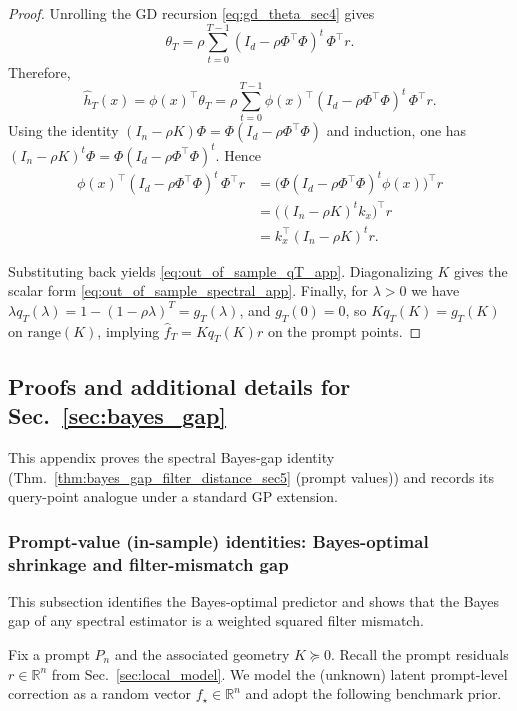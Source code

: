 \documentclass{article}
\theoremstyle{plain}
\theoremstyle{definition}
\theoremstyle{remark}
\begin{document}
\begin{proof}
Unrolling the GD recursion \eqref{eq:gd_theta_sec4} gives
\[
\theta_T
=
\rho\sum_{t=0}^{T-1}(I_d-\rho\Phi^\top\Phi)^t\,\Phi^\top r.
\]
Therefore,
\[
\hat h_T(x)
=
\phi(x)^\top\theta_T
=
\rho\sum_{t=0}^{T-1}\phi(x)^\top(I_d-\rho\Phi^\top\Phi)^t\,\Phi^\top r.
\]
Using the identity $(I_n-\rho K)\Phi=\Phi(I_d-\rho\Phi^\top\Phi)$ and induction, one has
$(I_n-\rho K)^t\Phi=\Phi(I_d-\rho\Phi^\top\Phi)^t$. Hence
\begin{align*}
    \phi(x)^\top(I_d-\rho\Phi^\top\Phi)^t\,\Phi^\top r 
    &= \bigl(\Phi(I_d-\rho\Phi^\top\Phi)^t\phi(x)\bigr)^\top r \\
    &= \bigl((I_n-\rho K)^t k_x\bigr)^\top r \\
    &= k_x^\top (I_n-\rho K)^t r. 
\end{align*}

Substituting back yields \eqref{eq:out_of_sample_qT_app}. Diagonalizing $K$ gives the scalar form
\eqref{eq:out_of_sample_spectral_app}. Finally, for $\lambda>0$ we have $\lambda q_T(\lambda)=1-(1-\rho\lambda)^T=g_T(\lambda)$,
and $g_T(0)=0$, so $K q_T(K)=g_T(K)$ on $\mathrm{range}(K)$, implying $\hat f_T=K q_T(K)r$ on the prompt points.
\end{proof}








\subsection{Proofs and additional details for Sec.~\ref{sec:bayes_gap}}
\label{app:bayes_gap_identities}
This appendix proves the spectral Bayes-gap identity (Thm.~\ref{thm:bayes_gap_filter_distance_sec5} (prompt values)) and records its query-point analogue under a standard GP extension. 

\subsubsection{Prompt-value (in-sample) identities: Bayes-optimal shrinkage and filter-mismatch gap}
\label{app:prompt_value_gap_identity}
This subsection identifies the Bayes-optimal predictor and shows that the Bayes gap of any spectral estimator is a weighted squared filter mismatch. 


Fix a prompt $P_n$ and the associated geometry $K\succeq 0$. Recall the prompt residuals $r\in\mathbb{R}^n$ from Sec.~\ref{sec:local_model}. We model the (unknown) latent prompt-level correction as a random vector
$f_\star\in\mathbb{R}^n$ and adopt the following benchmark prior.
\end{document}
